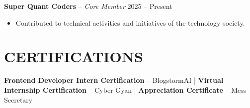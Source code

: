 \documentclass[a4paper,10pt]{article}
\begin{document}
\textbf{Super Quant Coders} -- \textit{Core Member} \hfill 2025 -- Present
\begin{itemize}
    \item Contributed to technical activities and initiatives of the technology society.
\end{itemize}

\section*{CERTIFICATIONS}

\textbf{Frontend Developer Intern Certification} -- BlogstormAI \quad | \quad
\textbf{Virtual Internship Certification} -- Cyber Gyan \quad | \quad
\textbf{Appreciation Certificate} -- Mess Secretary
\end{document}

